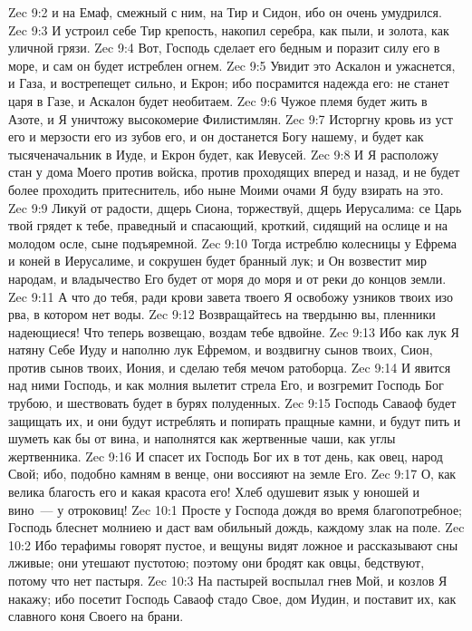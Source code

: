 \vs Zec 9:2 и на Емаф, смежный с ним, на Тир и Сидон, ибо он очень умудрился.
\vs Zec 9:3 И устроил себе Тир крепость, накопил серебра, как пыли, и золота, как уличной грязи.
\vs Zec 9:4 Вот, Господь сделает его бедным и поразит силу его в море, и сам он будет истреблен огнем.
\vs Zec 9:5 Увидит это Аскалон и ужаснется, и Газа, и вострепещет сильно, и Екрон; ибо посрамится надежда его: не станет царя в Газе, и Аскалон будет необитаем.
\vs Zec 9:6 Чужое племя будет жить в Азоте, и Я уничтожу высокомерие Филистимлян.
\vs Zec 9:7 Исторгну кровь из уст его и мерзости его из зубов его, и он достанется Богу нашему, и будет как тысяченачальник в Иуде, и Екрон будет, как Иевусей.
\vs Zec 9:8 И Я расположу стан у дома Моего против войска, против проходящих вперед и назад, и не будет более проходить притеснитель, ибо ныне Моими очами Я буду взирать на это.
\rsbpar\vs Zec 9:9 Ликуй от радости, дщерь Сиона, торжествуй, дщерь Иерусалима: се Царь твой грядет к тебе, праведный и спасающий, кроткий, сидящий на ослице и на молодом осле, сыне подъяремной.
\vs Zec 9:10 Тогда истреблю колесницы у Ефрема и коней в Иерусалиме, и сокрушен будет бранный лук; и Он возвестит мир народам, и владычество Его будет от моря до моря и от реки до концов земли.
\vs Zec 9:11 А что до тебя, ради крови завета твоего Я освобожу узников твоих изо рва, в котором нет воды.
\vs Zec 9:12 Возвращайтесь на твердыню вы, пленники надеющиеся! Что теперь возвещаю, воздам тебе вдвойне.
\vs Zec 9:13 Ибо как лук Я натяну Себе Иуду и наполню лук Ефремом, и воздвигну сынов твоих, Сион, против сынов твоих, Иония, и сделаю тебя мечом ратоборца.
\vs Zec 9:14 И явится над ними Господь, и как молния вылетит стрела Его, и возгремит Господь Бог трубою, и шествовать будет в бурях полуденных.
\vs Zec 9:15 Господь Саваоф будет защищать их, и они будут истреблять и попирать пращные камни, и будут пить и шуметь как бы от вина, и наполнятся как жертвенные чаши, как углы жертвенника.
\vs Zec 9:16 И спасет их Господь Бог их в тот день, как овец, народ Свой; ибо, подобно камням в венце, они воссияют на земле Его.
\vs Zec 9:17 О, как велика благость его и какая красота его! Хлеб одушевит язык у юношей и вино~--- у отроковиц!
\vs Zec 10:1 Просте у Господа дождя во время благопотребное; Господь блеснет молниею и даст вам обильный дождь, каждому злак на поле.
\vs Zec 10:2 Ибо терафимы говорят пустое, и вещуны видят ложное и рассказывают сны лживые; они утешают пустотою; поэтому они бродят как овцы, бедствуют, потому что нет пастыря.
\vs Zec 10:3 На пастырей воспылал гнев Мой, и козлов Я накажу; ибо посетит Господь Саваоф стадо Свое, дом Иудин, и поставит их, как славного коня Своего на брани.
